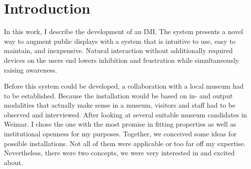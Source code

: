 \chapter{Introduction}
\label{introduction}


In this work, I describe the development of an \ac{IMI}. The system presents a novel way to augment public displays with a system that is intuitive to use, easy to maintain, and inexpensive. Natural interaction without additionally required devices on the users end lowers inhibition and frustration while simultaneously raising awareness.

Before this system could be developed, a collaboration with a local museum had to be established. Because the installation would be based on in- and output modalities that actually make sense in a museum, visitors and staff had to be observed and interviewed. After looking at several suitable museum candidates in Weimar. I chose the one with the most promise in fitting properties as well as institutional openness for my purposes. Together, we conceived some ideas for possible installations. Not all of them were applicable or too far off my expertise. Nevertheless, there were two concepts, we were very interested in and excited about.

